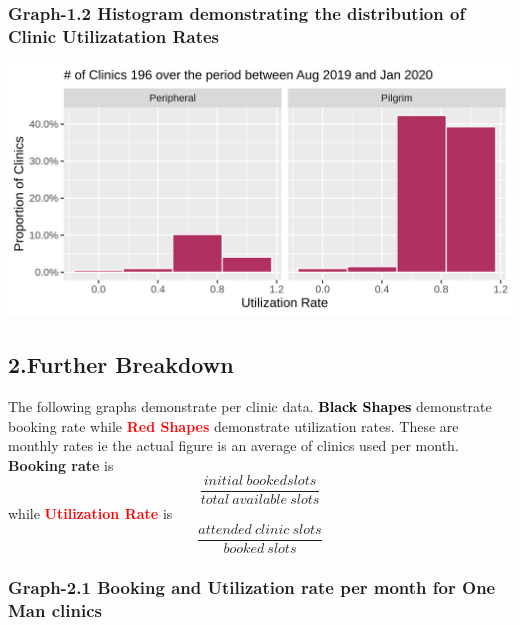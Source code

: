 \documentclass[]{article}
\begin{document}
\hypertarget{graph-1.2-histogram-demonstrating-the-distribution-of-clinic-utilizatation-rates}{%
\subsubsection{Graph-1.2 Histogram demonstrating the distribution of
Clinic Utilizatation
Rates}\label{graph-1.2-histogram-demonstrating-the-distribution-of-clinic-utilizatation-rates}}

\begin{center}\includegraphics{LF2_files/figure-latex/unnamed-chunk-5-1} \end{center}

\hypertarget{further-breakdown}{%
\subsection{2.Further Breakdown}\label{further-breakdown}}

The following graphs demonstrate per clinic data.
\textcolor{black}{\textbf{Black Shapes}} demonstrate booking rate while
\textcolor{red}{\textbf{Red Shapes}} demonstrate utilization rates.
These are monthly rates ie the actual figure is an average of clinics
used per month. \textbf{Booking rate} is
\[\frac{initial\ booked slots}{total\ available\ slots}\] while
\textcolor{red}{\textbf{Utilization Rate}} is
\[\frac{attended \ clinic\  slots}{booked\ slots}\]

\hypertarget{graph-2.1-booking-and-utilization-rate-per-month-for-one-man-clinics}{%
\subsubsection{Graph-2.1 Booking and Utilization rate per month for One
Man
clinics}\label{graph-2.1-booking-and-utilization-rate-per-month-for-one-man-clinics}}
\end{document}
